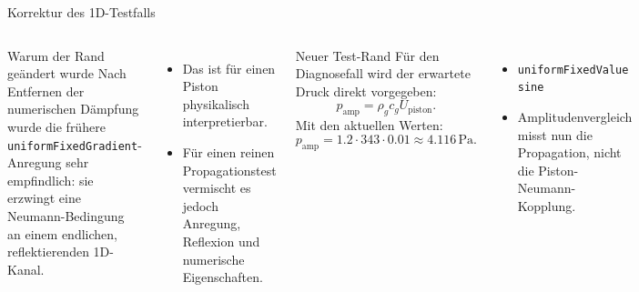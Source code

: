 \documentclass[
	german,%
	accentcolor=9c,%
	accept-missing-logos=true,%
]{tudabeamer}
\newcommand*{\code}[1]{\texttt{#1}}
\begin{document}
\begin{frame}{Korrektur des 1D-Testfalls}
    \scriptsize
    \setlength{\abovedisplayskip}{0.04cm}
    \setlength{\belowdisplayskip}{0.04cm}
    \begin{columns}[T]
    \begin{block}{Warum der Rand geändert wurde}
        Nach Entfernen der numerischen Dämpfung wurde die frühere
        \code{uniformFixedGradient}-Anregung sehr empfindlich: sie erzwingt
        eine Neumann-Bedingung an einem endlichen, reflektierenden 1D-Kanal.
    \end{block}
    \begin{itemize}
        \setlength{\itemsep}{0.05cm}
        \item Das ist für einen Piston physikalisch interpretierbar.
        \item Für einen reinen Propagationstest vermischt es jedoch
        Anregung, Reflexion und numerische Eigenschaften.
    \end{itemize}

    \begin{block}{Neuer Test-Rand}
        Für den Diagnosefall wird der erwartete Druck direkt vorgegeben:
        \[
            p_\mathrm{amp}=\rho_g c_g U_\mathrm{piston}.
        \]
        Mit den aktuellen Werten:
        \[
            p_\mathrm{amp}=1.2\cdot343\cdot0.01
            \approx4.116\,\mathrm{Pa}.
        \]
    \end{block}
    \begin{itemize}
        \setlength{\itemsep}{0.05cm}
        \item \code{uniformFixedValue sine}
        \item Amplitudenvergleich misst nun die Propagation, nicht die
        Piston-Neumann-Kopplung.
    \end{itemize}
    \end{columns}
\end{frame}
\end{document}
